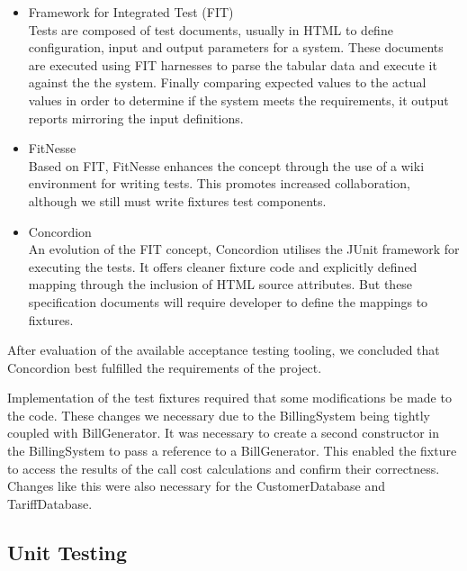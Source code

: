 \begin{itemize}
  \item Framework for Integrated Test (FIT)\\
Tests are composed of test documents, usually in HTML to define configuration, input and output parameters for a system. These documents are executed using FIT harnesses to parse the tabular data and execute it against the the system. Finally comparing expected values to the actual values in order to determine if the system meets the requirements, it output reports mirroring the input definitions. 
  \item FitNesse\\
Based on FIT, FitNesse enhances the concept through the use of a wiki environment for writing tests. This promotes increased collaboration, although we still must write fixtures test components.
  \item Concordion\\
An evolution of the FIT concept, Concordion utilises the JUnit framework for executing the tests. It offers cleaner fixture code and explicitly defined mapping through the inclusion of HTML source attributes. But these specification documents will require developer to define the mappings to fixtures.
\end{itemize}

After evaluation of the available acceptance testing tooling, we concluded that Concordion best fulfilled the requirements of the project. 

Implementation of the test fixtures required that some modifications be made to the code. These changes we necessary due to the BillingSystem being tightly coupled with BillGenerator.  It was necessary to create a second constructor in the BillingSystem to pass a reference to a BillGenerator. This enabled the fixture to access the results of the call cost calculations and confirm their correctness. Changes like this were also necessary for the CustomerDatabase and TariffDatabase. 


\subsection{Unit Testing}
